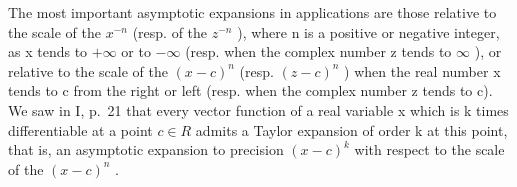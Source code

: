 The most important asymptotic expansions in applications are those relative to the scale of the \(x^{-n}\) (resp. of the \(z^{-n}\) ), where n is a positive or negative integer, as x tends to \(+\infty\) or to \(-\infty\) (resp. when the complex number z tends to \(\infty\) ), or relative to the scale of the \((x - c)^{n}\) (resp. \((z - c)^{n}\) ) when the real number x tends to c from the right or left (resp. when the complex number z tends to c). We saw in I, p.~21 that every vector function of a real variable x which is k times differentiable at a point \(c \in R\) admits a Taylor expansion of order k at this point, that is, an asymptotic expansion to precision \((x - c)^{k}\) with respect to the scale of the \((x - c)^{n}\) .

